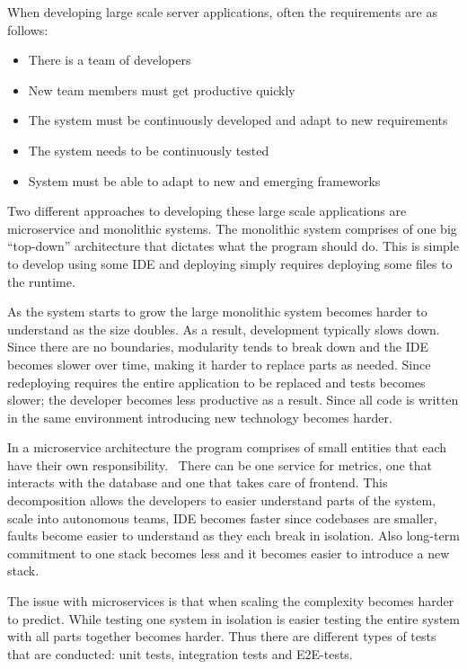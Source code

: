 When developing large scale server applications, often the requirements are as
follows:

\begin{itemize}
    \item There is a team of developers
    \item New team members must get productive quickly
    \item The system must be continuously developed and adapt to new
        requirements
    \item The system needs to be continuously tested
    \item System must be able to adapt to new and emerging frameworks
\end{itemize}

Two different approaches to developing these large scale applications are
microservice and monolithic systems. The monolithic system comprises of one big
``top-down'' architecture that dictates what the program should do. This is
simple to develop using some IDE and deploying simply requires deploying some
files to the runtime. 

As the system starts to grow the large monolithic system becomes harder to
understand as the size doubles. As a result, development typically slows down.
Since there are no boundaries, modularity tends to break down and the IDE
becomes slower over time, making it harder to replace parts as needed. Since
redeploying requires the entire application to be replaced and tests becomes
slower; the developer becomes less productive as a result. Since all code is
written in the same environment introducing new technology becomes harder.

In a microservice architecture the program comprises of small entities that
each have their own responsibility.~\cite{chenlianping} There can be
one service for metrics, one that interacts with the database and one that
takes care of frontend. This decomposition allows the developers to easier
understand parts of the system, scale into autonomous teams, IDE becomes faster
since codebases are smaller, faults become easier to understand as they each
break in isolation.  Also long-term commitment to one stack becomes less and it
becomes easier to introduce a new stack. 

The issue with microservices is that when scaling the complexity becomes harder
to predict. While testing one system in isolation is easier testing the entire
system with all parts together becomes harder. Thus there are different types of
tests that are conducted: unit tests, integration tests and E2E-tests.

